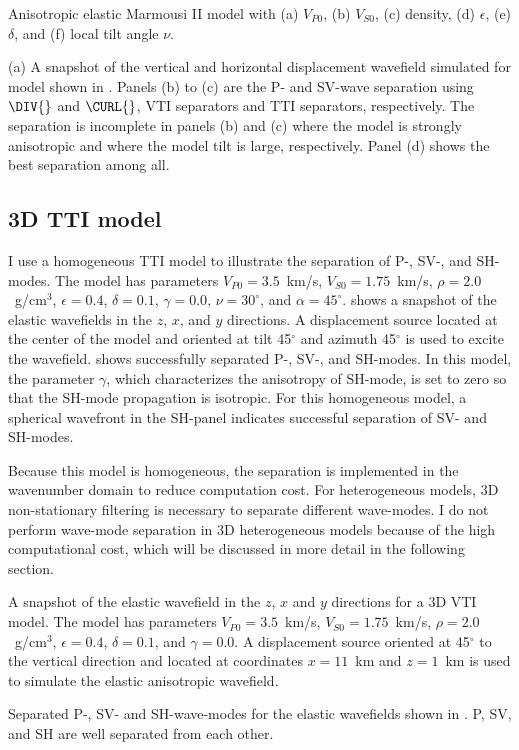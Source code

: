 {Anisotropic elastic Marmousi II model with (a) $V_{P0}$, (b) $V_{S0}$, 
(c) density, (d) $\epsilon$, (e) $\delta$, and (f) local tilt
angle $\nu$.  }

{(a) A snapshot of the vertical and horizontal displacement wavefield
simulated for model shown
in .  Panels (b) to (c) are
the P- and SV-wave separation using $\DIV{}$ and $\CURL{}$, VTI
separators and TTI separators, respectively. The separation is
incomplete in panels (b) and (c) where the model is strongly
anisotropic and where the model tilt is large, respectively. Panel (d)
shows the best separation among all.}


\subsection{3D TTI model}
I use a homogeneous TTI model to illustrate the separation of P-,
SV-, and SH-modes. The model has parameters $V_{P0}=3.5$~km/s,
$V_{S0}=1.75$~km/s, $\rho=2.0$~g/cm$^3$, $\epsilon=0.4$, $\delta=0.1$,
$\gamma=0.0$, $\nu=30^\circ$, and
$\alpha=45^\circ$.  shows a snapshot of the
elastic wavefields in the $z$, $x$, and $y$ directions. A displacement
source located at the center of the model and oriented at tilt
45$^\circ$ and azimuth 45$^\circ$ is used to excite the
wavefield.  shows successfully separated P-, SV-, and
SH-modes. In this model, the parameter $\gamma$, which characterizes
the anisotropy of SH-mode, is set to zero so that the SH-mode
propagation is isotropic. For this homogeneous model, a spherical
wavefront in the SH-panel indicates successful separation of SV- and
SH-modes.

Because this model is homogeneous, the separation is implemented in
the wavenumber domain to reduce computation cost. For heterogeneous
models, 3D non-stationary filtering is necessary to separate different
wave-modes. I do not perform wave-mode separation in 3D heterogeneous
models because of the high computational cost, which will be discussed
in more detail in the following section.




{A snapshot of the elastic wavefield in the $z$, $x$ and $y$
directions for a 3D VTI model. The model has parameters
$V_{P0}=3.5$~km/s, $V_{S0}=1.75$~km/s, $\rho=2.0$~g/cm$^3$,
$\epsilon=0.4$, $\delta=0.1$, and $\gamma=0.0$.  A displacement source
oriented at 45$^\circ$ to the vertical direction and located at
coordinates $x=11$~km and $z=1$~km is used to simulate the elastic
anisotropic wavefield.  }

{Separated P-, SV- and SH-wave-modes for the elastic wavefields shown in
.
P, SV, and SH are well separated from each other.}

